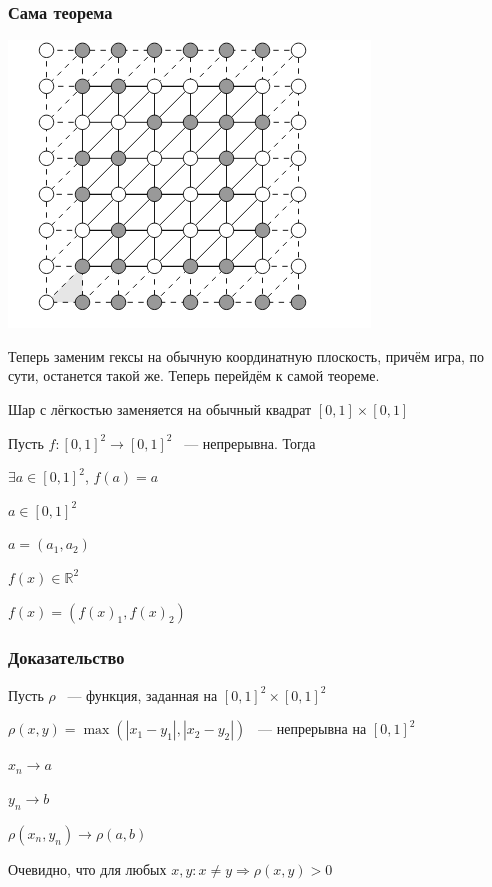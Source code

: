 \documentclass{article}
\begin{document}
		\subsubsection{Сама теорема}
		
			\includegraphics[scale=0.45]{NEWHEX.png}
		
			Теперь заменим гексы на обычную координатную плоскость, причём игра, по сути, останется такой же. Теперь перейдём к самой теореме.
			
			Шар с лёгкостью заменяется на обычный квадрат $[0, 1] \times [0, 1]$
			
			Пусть $f : [0, 1]^2 \rightarrow [0, 1]^2$ ~--- непрерывна. Тогда
			
			$\exists a \in [0, 1]^2$, $f(a) = a$
			
			$a \in [0, 1]^2$
			
			$a = (a_1, a_2)$
			
			$f(x) \in \mathbb{R}^2$
			
			$f(x) = (f(x)_1, f(x)_2)$
			
        \subsubsection{Доказательство}
			
			Пусть $\rho$ ~--- функция, заданная на $[0, 1]^2 \times [0, 1]^2$
				
			$\rho(x, y) = \max \left(|x_1 - y_1|, |x_2 - y_2|\right)$ ~--- непрерывна на $[0, 1]^2$
			
			$x_n \rightarrow a$
				
			$y_n \rightarrow b$
				
			$\rho(x_n, y_n) \rightarrow \rho(a, b)$
				
			Очевидно, что для любых $x, y: x \neq y \Rightarrow \rho(x, y) > 0$
				
\end{document}
